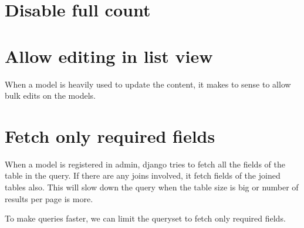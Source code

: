 \documentclass[letterpaper,12pt,english]{sphinxmanual}
\begin{document}
\section{Disable full count}
\label{\detokenize{admin_better_defaults:disable-full-count}}
\begin{sphinxVerbatim}[commandchars=\\\{\}]
  
\end{sphinxVerbatim}


\section{Allow editing in list view}
\label{\detokenize{admin_better_defaults:allow-editing-in-list-view}}
When a model is heavily used to update the content, it makes to sense to allow bulk edits on the models.

\begin{sphinxVerbatim}[commandchars=\\\{\}]
 
      
\end{sphinxVerbatim}


\section{Fetch only required fields}
\label{\detokenize{admin_better_defaults:fetch-only-required-fields}}
When a model is registered in admin, django tries to fetch all the fields of the table in the query. If there are any joins involved, it fetch fields of the joined tables also. This will slow down the query when the table size is big or number of results per page is more.

To make queries faster, we can limit the queryset to fetch only required fields.

\begin{sphinxVerbatim}[commandchars=\\\{\}]
 
      
          
           
         


 
\end{sphinxVerbatim}
\end{document}
